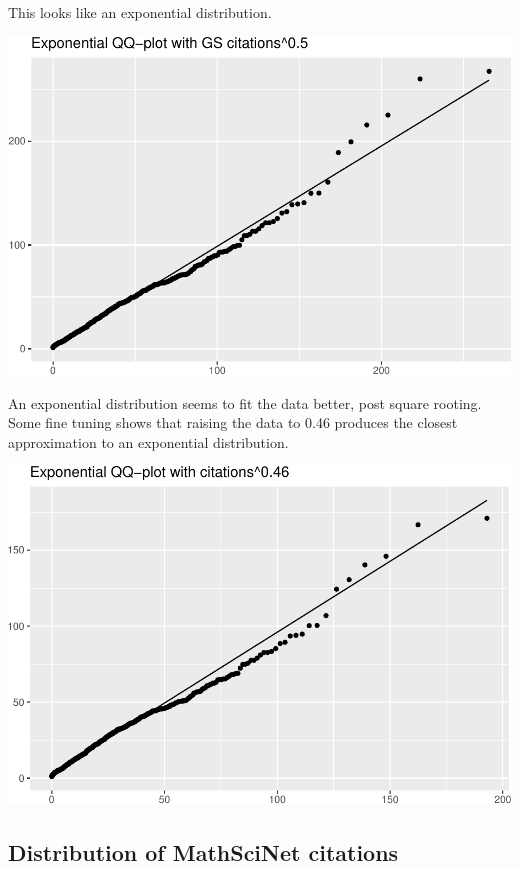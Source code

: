 \documentclass[]{article}
\begin{document}
This looks like an exponential distribution.

\includegraphics{final_files/figure-latex/unnamed-chunk-9-1.pdf}

An exponential distribution seems to fit the data better, post square
rooting. Some fine tuning shows that raising the data to 0.46 produces
the closest approximation to an exponential distribution.

\includegraphics{final_files/figure-latex/unnamed-chunk-10-1.pdf}

\hypertarget{distribution-of-mathscinet-citations}{%
\subsection{Distribution of MathSciNet
citations}\label{distribution-of-mathscinet-citations}}
\end{document}
